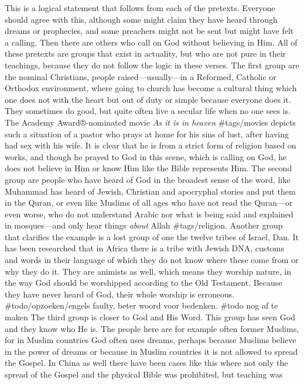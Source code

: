 This is a logical statement that follows from each of the pretexts.
Everyone should agree with this, although some might claim they have
heard through dreams or prophecies, and some preachers might not be sent
but might have felt a calling. Then there are others who call on God
without believing in Him. All of these pretexts are groups that exist in
actuality, but who are not pure in their teachings, because they do not
follow the logic in these verses. The first group are the nominal
Christians, people raised---usually---in a Reformed, Catholic or
Orthodox environment, where going to church has become a cultural thing
which one does not with the heart but out of duty or simple because
everyone does it. They sometimes do good, but quite often live a secular
life when no one sees is. The Academy Award®-nominated movie \emph{As it
is in heaven} \#tags/movies depicts such a situation of a pastor who
prays at home for his sins of lust, after having had sex with his wife.
It is clear that he is from a strict form of religion based on works,
and though he prayed to God in this scene, which is calling on God, he
does not believe in Him or know Him like the Bible represents Him. The
second group are people who have heard of God in the broadest sense of
the word, like Muhammad has heard of Jewish, Christian and apocryphal
stories and put them in the Quran, or even like Muslims of all ages who
have not read the Quran---or even worse, who do not understand Arabic
nor what is being said and explained in mosques---and only hear things
\emph{about} Allah \#tags/religion. Another group that clarifies the
example is a lost group of one the twelve tribes of Israel, Dan. It has
been researched that in Africa there is a tribe with Jewish DNA, customs
and words in their language of which they do not know where these come
from or why they do it. They are animists as well, which means they
worship nature, in the way God should be worshipped according to the Old
Testament. Because they have never heard of God, their whole worship is
erroneous. \#todo/opzoeken/engels faulty, beter woord voor bedenken.
\#todo nog af te maken The third group is closer to God and His Word.
This group has seen God and they know who He is. The people here are for
example often former Muslims, for in Muslim countries God often uses
dreams, perhaps because Muslims believe in the power of dreams or
because in Muslim countries it is not allowed to spread the Gospel. In
China as well there have been cases like this where not only the spread
of the Gospel and the physical Bible was prohibited, but teaching was
